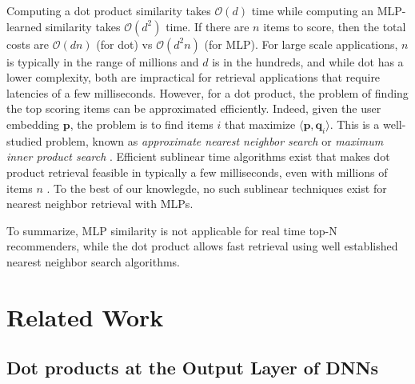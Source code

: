 \documentclass{article}
\newcommand{\embu}{\mathbf{p}}
\newcommand{\embi}{\mathbf{q}}
\renewcommand{\O}{\mathcal{O}}
\begin{document}
Computing a dot product similarity takes $\O(d)$ time while computing an MLP-learned similarity takes $\O(d^2)$ time.
If there are $n$ items to score, then the total costs are $\O(d n)$ (for dot) vs $\O(d^2 n)$ (for MLP).
For large scale applications, $n$ is typically in the range of millions and $d$ is in the hundreds, and while dot has a lower complexity, both are impractical for retrieval applications that require latencies of a few milliseconds.
However, for a dot product, the problem of finding the top scoring items can be approximated efficiently. Indeed, given the user embedding $\embu$, the problem is to find items $i$ that maximize $\langle \embu, \embi_i\rangle$. This is a well-studied problem, known as \emph{approximate nearest neighbor search} \cite{liu:nips04} or \emph{maximum inner product search} \cite{shrivastava:nips14}.
Efficient sublinear time algorithms exist that makes dot product retrieval feasible in typically a few milliseconds, even with millions of items $n$ \cite{covington:rs16}.
To the best of our knowlegde, no such sublinear techniques exist for nearest neighbor retrieval with MLPs.

To summarize, MLP similarity is not applicable for real time top-N recommenders, while the dot product allows fast retrieval using well established nearest neighbor search algorithms.


\section{Related Work}

\subsection{Dot products at the Output Layer of DNNs}
\end{document}
